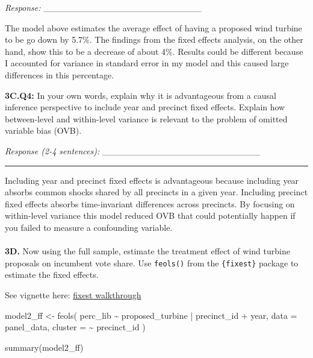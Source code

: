 \documentclass[
  letterpaper,
  DIV=11,
  numbers=noendperiod]{scrartcl}
\makeatletter
\let\oldparagraph\paragraph
\renewcommand{\paragraph}{
    \@ifstar
      \xxxParagraphStar
      \xxxParagraphNoStar
  }
\newcommand{\xxxParagraphStar}[1]{\oldparagraph*{#1}\mbox{}}
\newcommand{\xxxParagraphNoStar}[1]{\oldparagraph{#1}\mbox{}}
\newenvironment{Shaded}{\begin{snugshade}}{\end{snugshade}}
\newcommand{\AttributeTok}[1]{\textcolor[rgb]{0.40,0.45,0.13}{#1}}
\newcommand{\FunctionTok}[1]{\textcolor[rgb]{0.28,0.35,0.67}{#1}}
\newcommand{\NormalTok}[1]{\textcolor[rgb]{0.00,0.23,0.31}{#1}}
\newcommand{\OtherTok}[1]{\textcolor[rgb]{0.00,0.23,0.31}{#1}}
\newcommand{\SpecialCharTok}[1]{\textcolor[rgb]{0.37,0.37,0.37}{#1}}
\makeatother
\begin{document}
\emph{Response:} \_\_\_\_\_\_\_\_\_\_\_\_\_\_\_\_\_\_\_\_\_\_\_\_\_

The model above estimates the average effect of having a proposed wind
turbine to be go down by 5.7\%. The findings from the fixed effects
analysis, on the other hand, show this to be a decrease of about 4\%.
Results could be different because I accounted for variance in standard
error in my model and this caused large differences in this percentage.

\textbf{3C.Q4:} In your own words, explain why it is advantageous from a
causal inference perspective to include year and precinct fixed effects.
Explain how between-level and within-level variance is relevant to the
problem of omitted variable bias (OVB).

\emph{Response (2-4 sentences):}
\_\_\_\_\_\_\_\_\_\_\_\_\_\_\_\_\_\_\_\_\_\_\_\_\_

\begin{center}\rule{0.5\linewidth}{0.5pt}\end{center}

Including year and precinct fixed effects is advantageous because
including year absorbs common shocks shared by all precincts in a given
year. Including precinct fixed effects absorbs time-invariant
differences across precincts. By focusing on within-level variance this
model reduced OVB that could potentially happen if you failed to measure
a confounding variable.

\paragraph{\texorpdfstring{\textbf{3D.} Now using the full sample,
estimate the treatment effect of wind turbine proposals on incumbent
vote share. Use \texttt{feols()} from the \texttt{\{fixest\}} package to
estimate the fixed
effects.}{3D. Now using the full sample, estimate the treatment effect of wind turbine proposals on incumbent vote share. Use feols() from the \{fixest\} package to estimate the fixed effects.}}\label{d.-now-using-the-full-sample-estimate-the-treatment-effect-of-wind-turbine-proposals-on-incumbent-vote-share.-use-feols-from-the-fixest-package-to-estimate-the-fixed-effects.}

See vignette here:
\href{https://cran.r-project.org/web/packages/fixest/vignettes/fixest_walkthrough.html\#11_Estimation}{fixest
walkthrough}

\begin{Shaded}
\begin{Highlighting}[]
\NormalTok{model2\_ff }\OtherTok{\textless{}{-}} \FunctionTok{feols}\NormalTok{(}
\NormalTok{  perc\_lib }\SpecialCharTok{\textasciitilde{}}\NormalTok{ proposed\_turbine }\SpecialCharTok{|}\NormalTok{ precinct\_id }\SpecialCharTok{+}\NormalTok{ year,}
  \AttributeTok{data =}\NormalTok{ panel\_data, }
  \AttributeTok{cluster =} \SpecialCharTok{\textasciitilde{}}\NormalTok{ precinct\_id}
\NormalTok{)}

\FunctionTok{summary}\NormalTok{(model2\_ff)}
\end{Highlighting}
\end{Shaded}
\end{document}
